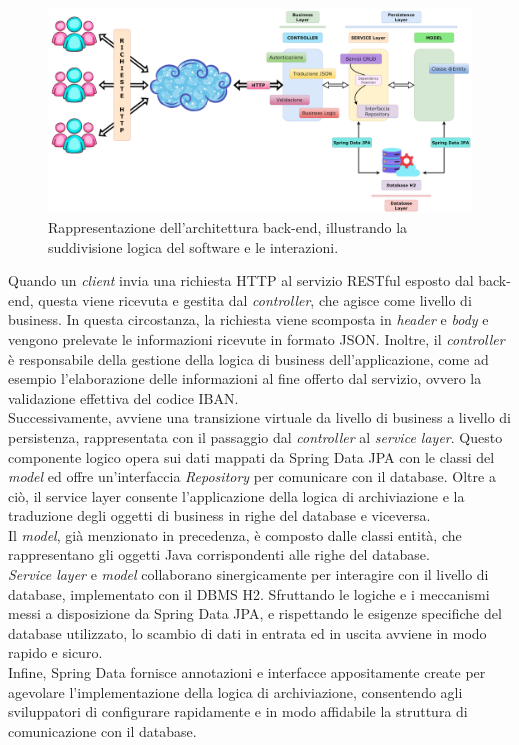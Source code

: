 \begin{figure}[H]
  \centering
  \includegraphics[width=1\textwidth]{img/SpringBoot_Diagramma.png}
  \caption{Rappresentazione dell’architettura back-end, illustrando la suddivisione logica del software e le interazioni.} 
  \label{fig:SpringBoot_Diagramma.png}
\end{figure}
Quando un \textit{client} invia una richiesta HTTP al servizio RESTful esposto dal back-end, questa viene ricevuta e gestita dal \textit{controller}, che agisce come livello di business. In questa circostanza, la richiesta viene scomposta in \textit{header} e \textit{body} e vengono prelevate le informazioni ricevute in formato JSON. Inoltre, il \textit{controller} è responsabile della gestione della logica di business dell’applicazione, come ad esempio l’elaborazione delle informazioni al fine offerto dal servizio, ovvero la validazione effettiva del codice IBAN.\\
Successivamente, avviene una transizione virtuale da livello di business a livello di persistenza, rappresentata con il passaggio dal \textit{controller} al \textit{service layer}. Questo componente logico opera sui dati mappati da Spring Data JPA con le classi del \textit{model} ed offre un’interfaccia \textit{Repository} per comunicare con il database. Oltre a ciò, il service layer consente l’applicazione della logica di archiviazione e la traduzione degli oggetti di business in righe del database e viceversa.\\
Il \textit{model}, già menzionato in precedenza, è composto dalle classi entità, che rappresentano gli oggetti Java corrispondenti alle righe del database.\\
\textit{Service layer} e \textit{model} collaborano sinergicamente per interagire con il livello di database, implementato con il DBMS H2. Sfruttando le logiche e i meccanismi messi a disposizione da Spring Data JPA, e rispettando le esigenze specifiche del database utilizzato, lo scambio di dati in entrata ed in uscita avviene in modo rapido e sicuro.\\
Infine, Spring Data fornisce annotazioni e interfacce appositamente create per agevolare l’implementazione della logica di archiviazione, consentendo agli sviluppatori di configurare rapidamente e in modo affidabile la struttura di comunicazione con il database.

